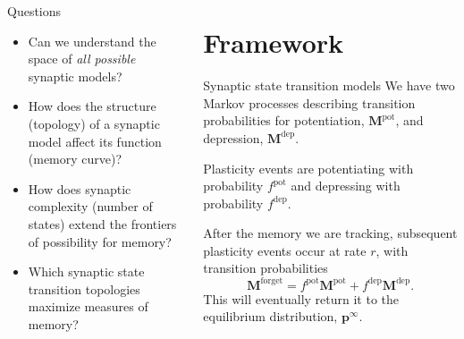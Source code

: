 \documentclass[final,hyperref={pdfpagelabels=false,bookmarks=false}]{beamer}
\newcommand{\pot}{^\text{pot}}
\newcommand{\dep}{^\text{dep}}
\newcommand{\frg}{^\text{forget}}
\newcommand{\eq}{\mathbf{p}^\infty}
\newcommand{\M}{\mathbf{M}}
\begin{document}
\begin{frame}{}
\begin{columns}[t]
\begin{column}{0.27\linewidth}
\begin{block}{Questions}
%
 \begin{itemize}
   \item Can we understand the space of \emph{all possible} synaptic models?
   \item How does the structure (topology) of a synaptic model affect its function (memory curve)?
   \item How does synaptic complexity (number of states) extend the frontiers of possibility for memory?
   \item Which synaptic state transition topologies maximize measures of memory?
 \end{itemize}
%
\end{block}


\end{column}

\begin{column}{0.37\linewidth}

\section{Framework}


\begin{block}{Synaptic state transition models}
%
%
 We have two Markov processes describing transition probabilities for potentiation, $\M\pot$, and depression, $\M\dep$.

 \vp Plasticity events are potentiating with probability $f\pot$ and depressing with probability $f\dep$.

 \vp After the memory we are tracking, subsequent plasticity events occur at rate $r$, with transition probabilities
 \begin{equation*}
   \M\frg = f\pot\M\pot + f\dep\M\dep.
 \end{equation*}
 This will eventually return it to the equilibrium distribution, $\eq$.

%
\end{block}



\end{column}
\end{columns}
\end{frame}
\end{document}
